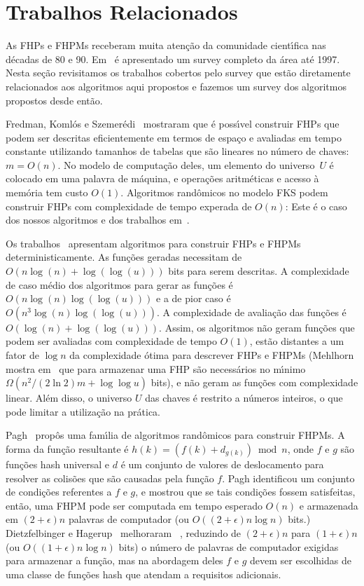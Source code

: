 \section{Trabalhos Relacionados}
As FHPs e FHPMs receberam muita aten\c{c}\~ao da comunidade 
cient\'{\i}fica nas d\'ecadas de 80 e 90. Em~\cite{chm97} \'e 
apresentado um survey completo da \'area at\'e 1997.
Nesta se\c{c}\~ao revisitamos os trabalhos cobertos pelo survey que
est\~ao diretamente relacionados aos algoritmos aqui propostos e
fazemos um survey dos algoritmos propostos desde ent\~ao.
 
Fredman, Koml\'os e Szemer\'edi~\cite{FKS84} mostraram que \'e poss\'{\i}vel construir
FHPs que podem ser descritas eficientemente em termos de espa\c{c}o e avaliadas em 
tempo constante utilizando tamanhos de tabelas que s\~ao lineares no n\'umero de chaves:
$m=O(n)$. 
No modelo de computa\c{c}\~ao deles, um elemento do universo~$U$ \'e colocado em uma 
palavra de m\'aquina, e opera\c{c}\~oes aritm\'eticas e acesso \`a mem\'oria tem custo 
$O(1)$.
Algoritmos rand\^omicos no modelo FKS podem construir FHPs com complexidade de tempo 
experada de $O(n)$: 
Este \'e o caso dos nossos algoritmos e dos trabalhos em~\cite{chm92,p99}.

Os trabalhos~\cite{asw00,swz00} apresentam algoritmos para construir
FHPs e FHPMs deterministicamente. 
As fun\c{c}\~oes geradas necessitam de $O(n \log(n) + \log(\log(u)))$ bits para serem descritas.
A complexidade de caso m\'edio dos algoritmos para gerar as fun\c{c}\~oes \'e 
$O(n\log(n) \log( \log (u)))$ e a de pior caso \'e $O(n^3\log(n) \log(\log(u)))$. 
A complexidade de avalia\c{c}\~ao das fun\c{c}\~oes \'e $O(\log(n) + \log(\log(u)))$.
Assim, os algoritmos n\~ao geram fun\c{c}\~oes que podem ser avaliadas com complexidade 
de tempo $O(1)$, est\~ao distantes a um fator de $\log n$ da complexidade \'otima para descrever 
FHPs e FHPMs (Mehlhorn mostra em~\cite{m84} 
que para armazenar uma FHP s\~ao necess\'arios no m\'{\i}nimo 
$\Omega(n^2/(2\ln 2) m + \log\log u)$ bits), e n\~ao geram as 
fun\c{c}\~oes com complexidade linear.
Al\'em disso, o universo $U$ das chaves \'e restrito a n\'umeros inteiros, o que pode 
limitar a utiliza\c{c}\~ao na pr\'atica. 

Pagh~\cite{p99} prop\^os uma fam\'{\i}lia de algoritmos rand\^omicos para construir
FHPMs.
A forma da fun\c{c}\~ao resultante \'e $h(k) = (f(k) + d_{g(k)}) \bmod n$, 
onde $f$ e $g$ s\~ao fun\c{c}\~oes hash universal \cite{ss89} e $d$ \'e um conjunto de 
valores de deslocamento para resolver as colis\~oes que s\~ao causadas pela fun\c{c}\~ao $f$.
Pagh identificou um conjunto de condi\c{c}\~oes referentes a $f$ e $g$, e mostrou 
que se tais condi\c{c}\~oes fossem satisfeitas, ent\~ao, uma FHPM pode ser computada
em tempo esperado $O(n)$ e armazenada em $(2+\epsilon)n$ palavras de computador 
(ou $O((2+\epsilon)n \log n)$ bits.)
Dietzfelbinger e Hagerup~\cite{dh01} melhoraram ~\cite{p99},
reduzindo de $(2+\epsilon)n$ para $(1+\epsilon)n$ (ou $O((1+\epsilon)n \log n)$ bits) 
o n\'umero de palavras de 
computador exigidas para armazenar a fun\c{c}\~ao, mas na abordagem deles $f$ e $g$
devem ser escolhidas de uma classe de fun\c{c}\~oes hash que atendam a requisitos
adicionais.

